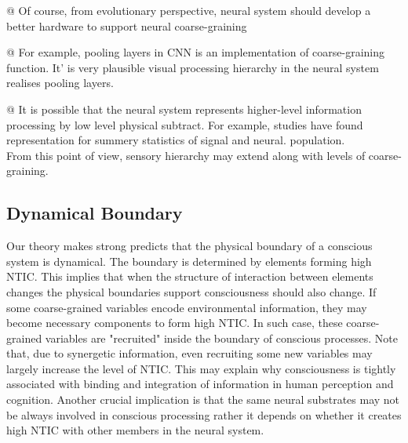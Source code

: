 \documentclass[utf8]{article}
\begin{document}
            \begin{WritingMaterials}
    			@ Of course, from evolutionary perspective, neural system should develop a better hardware to support neural coarse-graining

				@ For example, pooling layers in CNN is an implementation of coarse-graining function. It' is very plausible visual processing hierarchy in the neural system realises pooling layers.


				@ It is possible that the neural system represents higher-level information processing by low level physical subtract. For example, studies have found representation for summery statistics of signal and neural. population.\\
				From this point of view, sensory hierarchy may extend along with levels of coarse-graining.
            \end{WritingMaterials}
        

        
               
\rlend

        \subsection{Dynamical Boundary}
        Our theory makes strong predicts that the physical boundary of a conscious system is dynamical. The boundary is determined by elements forming high NTIC. This implies that when the structure of interaction between elements changes the physical boundaries support consciousness should also change. If some coarse-grained variables encode environmental information, they may become necessary components to form high NTIC. In such case, these coarse-grained variables are "recruited" inside the boundary of conscious processes. Note that, due to synergetic information, even recruiting some new variables may largely increase the level of NTIC. 
        This may explain why consciousness is tightly associated with binding and integration of information in human perception and cognition. Another crucial implication is that the same neural substrates may not be always involved in conscious processing rather it depends on whether it creates high NTIC with other members in the neural system. 
    
\rlend

    
\end{document}
